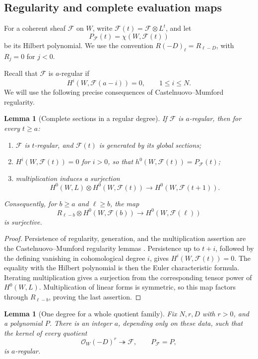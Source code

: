 \documentclass[11pt,reqno]{amsart}
\numberwithin{equation}{section}
\newtheorem{lemma}[theorem]{Lemma}
\theoremstyle{definition}
\theoremstyle{remark}
\begin{document}
\subsection{Regularity and complete evaluation maps}

For a coherent sheaf \(\mathscr F\) on \(W\), write
\(\mathscr F(t)=\mathscr F\otimes L^t\), and let
\[
 P_{\mathscr F}(t)=\chi(W,\mathscr F(t))
\]
be its Hilbert polynomial. We use the convention
\(R(-D)_\ell=R_{\ell-D}\), with \(R_j=0\) for \(j<0\).

Recall that \(\mathscr F\) is \(a\)-regular if
\[
 H^i(W,\mathscr F(a-i))=0,\qquad 1\leq i\leq N.
\]
We will use the following precise consequences of
Castelnuovo--Mumford regularity.

\begin{lemma}[Complete sections in a regular degree]
\label{alg:regular-sections}
If \(\mathscr F\) is \(a\)-regular, then for every \(t\geq a\):
\begin{enumerate}
\item \(\mathscr F\) is \(t\)-regular, and \(\mathscr F(t)\) is generated
by its global sections;
\item \(H^i(W,\mathscr F(t))=0\) for \(i>0\), so that
\(h^0(W,\mathscr F(t))=P_{\mathscr F}(t)\);
\item multiplication induces a surjection
\[
 H^0(W,L)\otimes H^0(W,\mathscr F(t))
 \longrightarrow H^0(W,\mathscr F(t+1)).
\]
\end{enumerate}
Consequently, for \(b\geq a\) and \(\ell\geq b\), the map
\[
 R_{\ell-b}\otimes H^0(W,\mathscr F(b))
 \longrightarrow H^0(W,\mathscr F(\ell))
\]
is surjective.
\end{lemma}

\begin{proof}
Persistence of regularity, generation, and the multiplication assertion
are the Castelnuovo--Mumford regularity lemmas
\cite[Tags 08A6--08A8]{StacksRegularity}. Persistence up to \(t+i\),
followed by the defining vanishing in cohomological degree \(i\), gives
\(H^i(W,\mathscr F(t))=0\). The equality with the Hilbert polynomial is
then the Euler characteristic formula. Iterating multiplication gives a
surjection from the corresponding tensor power of \(H^0(W,L)\).
Multiplication of linear forms is symmetric, so this map factors through
\(R_{\ell-b}\), proving the last assertion.
\end{proof}

\begin{lemma}[One degree for a whole quotient family]
\label{alg:uniform-regularity}
Fix \(N,r,D\) with \(r>0\), and a polynomial \(P\). There is an integer
\(a\), depending only on these data, such that the kernel of every
quotient
\[
 \mathcal O_W(-D)^r\twoheadrightarrow\mathscr F,
 \qquad P_{\mathscr F}=P,
\]
is \(a\)-regular.
\end{lemma}
\end{document}
